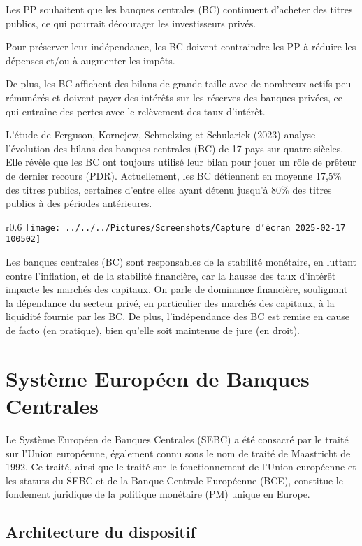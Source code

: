 \documentclass[a4paper, 12pt]{report}
\begin{document}
Les PP souhaitent que les banques centrales (BC) continuent d'acheter des titres publics, ce qui pourrait décourager les investisseurs privés. 

Pour préserver leur indépendance, les BC doivent contraindre les PP à réduire les dépenses et/ou à augmenter les impôts. 

De plus, les BC affichent des bilans de grande taille avec de nombreux actifs peu rémunérés et doivent payer des intérêts sur les réserves des banques privées, ce qui entraîne des pertes avec le relèvement des taux d'intérêt.

L'étude de Ferguson, Kornejew, Schmelzing et Schularick (2023) analyse l'évolution des bilans des banques centrales (BC) de 17 pays sur quatre siècles. Elle révèle que les BC ont toujours utilisé leur bilan pour jouer un rôle de prêteur de dernier recours (PDR). Actuellement, les BC détiennent en moyenne 17,5\% des titres publics, certaines d'entre elles ayant détenu jusqu'à 80\% des titres publics à des périodes antérieures.

\begin{wrapfigure}{r}{0.6\textwidth}
	\centering
\texttt{[image: ../../../Pictures/Screenshots/Capture d'écran 2025-02-17 100502]}
\end{wrapfigure}

Les banques centrales (BC) sont responsables de la stabilité monétaire, en luttant contre l'inflation, et de la stabilité financière, car la hausse des taux d'intérêt impacte les marchés des capitaux. On parle de dominance financière, soulignant la dépendance du secteur privé, en particulier des marchés des capitaux, à la liquidité fournie par les BC. De plus, l'indépendance des BC est remise en cause de facto (en pratique), bien qu'elle soit maintenue de jure (en droit).

\section{Système Européen de Banques Centrales}

Le Système Européen de Banques Centrales (SEBC) a été consacré par le traité sur l'Union européenne, également connu sous le nom de traité de Maastricht de 1992. Ce traité, ainsi que le traité sur le fonctionnement de l'Union européenne et les statuts du SEBC et de la Banque Centrale Européenne (BCE), constitue le fondement juridique de la politique monétaire (PM) unique en Europe.

\subsection{Architecture du dispositif}
\end{document}
